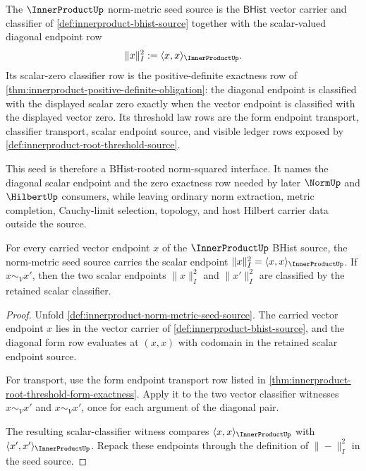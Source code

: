 \begin{definition}
\label{def:innerproduct-norm-metric-seed-source}
The $\InnerProductUp$ norm-metric seed source is the $\mathsf{BHist}$ vector
carrier and classifier of \autoref{def:innerproduct-bhist-source} together
with the scalar-valued diagonal endpoint row
$$
\|x\|_{I}^{2}:=\langle x,x\rangle_{\InnerProductUp}.
$$
Its scalar-zero classifier row is the positive-definite exactness row of
\autoref{thm:innerproduct-positive-definite-obligation}: the diagonal
endpoint is classified with the displayed scalar zero exactly when the vector
endpoint is classified with the displayed vector zero. Its threshold law rows
are the form endpoint transport, classifier transport, scalar endpoint source,
and visible ledger rows exposed by
\autoref{def:innerproduct-root-threshold-source}.

This seed is therefore a BHist-rooted norm-squared interface. It names the
diagonal scalar endpoint and the zero exactness row needed by later
$\NormUp$ and $\HilbertUp$ consumers, while leaving ordinary norm extraction,
metric completion, Cauchy-limit selection, topology, and host Hilbert carrier
data outside the source.
\end{definition}

\begin{theorem}
\label{thm:innerproduct-norm-squared-carrier-row}
For every carried vector endpoint $x$ of the $\InnerProductUp$ BHist source,
the norm-metric seed source carries the scalar endpoint
$\|x\|_{I}^{2}=\langle x,x\rangle_{\InnerProductUp}$. If
$x\sim_V x'$, then the two scalar endpoints
$\|x\|_{I}^{2}$ and $\|x'\|_{I}^{2}$ are classified by the retained scalar
classifier.
\end{theorem}
\begin{proof}
Unfold \autoref{def:innerproduct-norm-metric-seed-source}. The carried vector
endpoint $x$ lies in the vector carrier of
\autoref{def:innerproduct-bhist-source}, and the diagonal form row evaluates
at $(x,x)$ with codomain in the retained scalar endpoint source.

For transport, use the form endpoint transport row listed in
\autoref{thm:innerproduct-root-threshold-form-exactness}. Apply it to the two
vector classifier witnesses $x\sim_V x'$ and $x\sim_V x'$, once for each
argument of the diagonal pair.

The resulting scalar-classifier witness compares
$\langle x,x\rangle_{\InnerProductUp}$ with
$\langle x',x'\rangle_{\InnerProductUp}$. Repack these endpoints through the
definition of $\|-\|_{I}^{2}$ in the seed source.
\end{proof}

